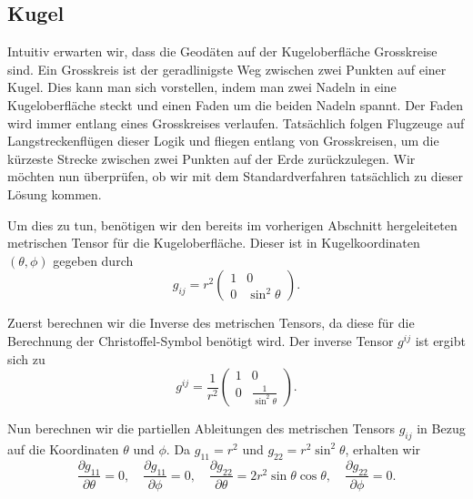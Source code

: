 %
%
%
%
\subsection{Kugel\label{geodaeten:section:Standardverfahren:Kugel}}

Intuitiv erwarten wir, dass die Geodäten auf der Kugeloberfläche Grosskreise sind.
Ein Grosskreis ist der geradlinigste Weg zwischen zwei Punkten auf einer Kugel.
Dies kann man sich vorstellen, indem man zwei Nadeln in eine Kugeloberfläche steckt und einen Faden um die beiden Nadeln spannt.
Der Faden wird immer entlang eines Grosskreises verlaufen.
Tatsächlich folgen Flugzeuge auf Langstreckenflügen dieser Logik und fliegen entlang von Grosskreisen, um die kürzeste Strecke zwischen zwei Punkten auf der Erde zurückzulegen.
Wir möchten nun überprüfen, ob wir mit dem Standardverfahren tatsächlich zu dieser Lösung kommen.

Um dies zu tun, benötigen wir den bereits im vorherigen Abschnitt hergeleiteten metrischen Tensor für die Kugeloberfläche.
Dieser ist in Kugelkoordinaten $(\theta, \phi)$ gegeben durch
\begin{equation}
	g_{ij} = r^2 \begin{pmatrix}
		1 & 0 \\
		0 & \sin^2\theta
	\end{pmatrix}.
\end{equation}

Zuerst berechnen wir die Inverse des metrischen Tensors, da diese für die Berechnung der Christoffel-Symbol benötigt wird.
Der inverse Tensor $g^{ij}$ ist ergibt sich zu
\begin{equation}
	g^{ij} = \frac{1}{r^2} 
	\begin{pmatrix}
		1 & 0 \\
		0 & \frac{1}{\sin^2\theta}
	\end{pmatrix}.
	\label{geodaeten:equation:StaKugel:TensorInverse}
\end{equation}

Nun berechnen wir die partiellen Ableitungen des metrischen Tensors $g_{ij}$ in Bezug auf die Koordinaten $\theta$ und $\phi$.
Da $g_{11} = r^2$ und $g_{22} = r^2 \sin^2\theta$, erhalten wir
\begin{equation}
	\frac{\partial g_{11}}{\partial \theta} = 0, \quad \frac{\partial g_{11}}{\partial \phi} = 0, \quad \frac{\partial g_{22}}{\partial \theta} = 2r^2 \sin\theta \cos\theta, \quad \frac{\partial g_{22}}{\partial \phi} = 0.
	\label{geodaeten:equation:StaKugel:Ableitungen}
\end{equation}

